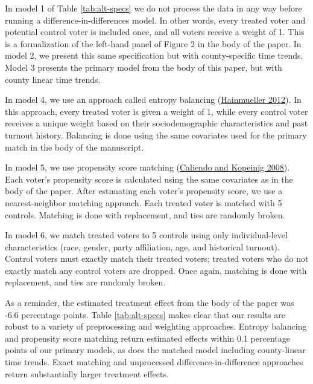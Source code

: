\documentclass[
  12pt,
]{article}
\begin{document}
In model 1 of Table \ref{tab:alt-specs} we do not process the data in any way before running a difference-in-differences model. In other words, every treated voter and potential control voter is included once, and all voters receive a weight of 1. This is a formalization of the left-hand panel of Figure 2 in the body of the paper. In model 2, we present this same specification but with county-specific time trends. Model 3 presents the primary model from the body of this paper, but with county linear time trends.

In model 4, we use an approach called entropy balancing (\protect\hyperlink{ref-Hainmueller2012}{Hainmueller 2012}). In this approach, every treated voter is given a weight of 1, while every control voter receives a unique weight based on their sociodemographic characteristics and past turnout history. Balancing is done using the same covariates used for the primary match in the body of the manuscript.

In model 5, we use propensity score matching (\protect\hyperlink{ref-Caliendo2008}{Caliendo and Kopeinig 2008}). Each voter's propensity score is calculated using the same covariates as in the body of the paper. After estimating each voter's propensity score, we use a nearest-neighbor matching approach. Each treated voter is matched with 5 controls. Matching is done with replacement, and ties are randomly broken.

In model 6, we match treated voters to 5 controls using only individual-level characteristics (race, gender, party affiliation, age, and historical turnout). Control voters must exactly match their treated voters; treated voters who do not exactly match any control voters are dropped. Once again, matching is done with replacement, and ties are randomly broken.

As a reminder, the estimated treatment effect from the body of the paper was -6.6 percentage points. Table \ref{tab:alt-specs} makes clear that our results are robust to a variety of preprocessing and weighting approaches. Entropy balancing and propensity score matching return estimated effects within 0.1 percentage points of our primary models, as does the matched model including county-linear time trends. Exact matching and unprocessed difference-in-difference approaches return substantially larger treatment effects.

\begin{singlespace}

\end{singlespace}
\end{document}
